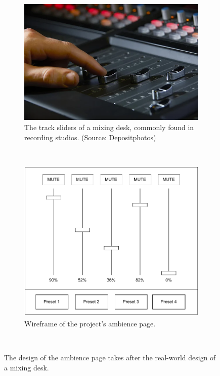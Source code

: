 \begin{figure}[htb] 
    \centering
    \begin{subfigure}[b]{0.45\textwidth}
        \includegraphics[width=\textwidth]{images/design/mixing-desk.png}
        \caption{The track sliders of a mixing desk, commonly found in recording studios. (Source: Depositphotos)}
        \label{fig:mixing-desk}
    \end{subfigure}
    ~
    \begin{subfigure}[b]{0.45\textwidth}
        \includegraphics[width=\textwidth]{images/design/mixer-wireframe.pdf}
        \caption{Wireframe of the project's ambience page.}
        \label{fig:mixer-wireframe}
    \end{subfigure}
    ~
    \caption{
    The design of the  ambience page takes after the real-world design of a  mixing desk.
    }\label{fig:mixer-design}
\end{figure}


